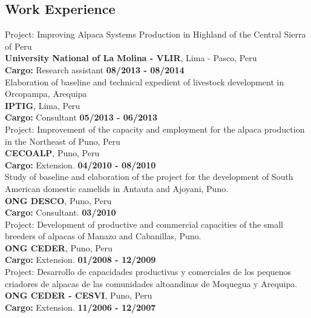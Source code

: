 \documentclass[margin,line,10pt]{res}
\begin{document}
\begin{resume}
\section{\sc Work \phantom{1cm} Experience}

Project: Improving Alpaca Systems Production in Highland of the Central Sierra of Peru\\
{\bf University National of La Molina - VLIR}, Lima - Pasco, Peru\\
\vspace{-.3cm}
\textbf{Cargo:} Research assistant \hfill {\bf 08/2013 - 08/2014}\\

Elaboration of baseline and technical expedient of livestock development in Orcopampa, Arequipa\\
{\bf IPTIG}, Lima, Peru\\
\vspace{-.3cm}
\textbf{Cargo:} Consultant  \hfill {\bf 05/2013 - 06/2013}\\

Project: Improvement of the capacity and employment for the alpaca production in the Northeast of Puno, Peru\\
{\bf CECOALP}, Puno, Peru\\
\vspace{-.3cm}
\textbf{Cargo:} Extension.  \hfill {\bf 04/2010 - 08/2010}\\

Study of baseline and elaboration of the project for the development of South American domestic camelids in Antauta and Ajoyani, Puno.\\
{\bf ONG DESCO}, Puno, Peru\\
\vspace{-.3cm}
\textbf{Cargo:} Consultant.  \hfill {\bf 03/2010}\\

Project: Development of productive and commercial capacities of the small breeders of alpacas of Manazo and Cabanillas, Puno.\\
{\bf ONG CEDER}, Puno, Peru\\
\vspace{-.3cm}
\textbf{Cargo:} Extension.  \hfill {\bf 01/2008 - 12/2009}\\

Project: Desarrollo de capacidades productivas y comerciales de los pequenos criadores de alpacas de las comunidades altoandinas de Moquegua y Arequipa.\\
{\bf ONG CEDER - CESVI}, Puno, Peru\\
\vspace{-.3cm}
\textbf{Cargo:} Extension.  \hfill {\bf 11/2006 - 12/2007}\\


\end{resume}
\end{document}
